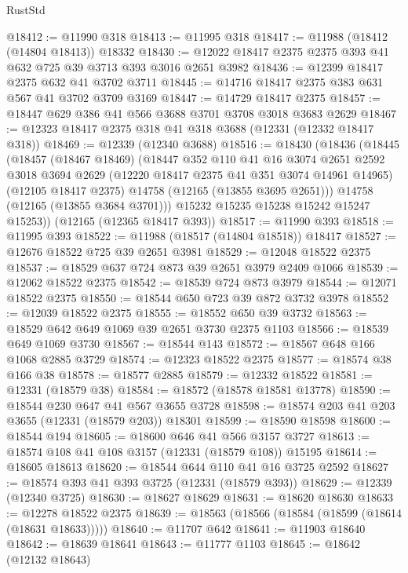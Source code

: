 \begin{lexlean}{RustStd}
\begin{coremodule}
@18412 := @11990 @318
@18413 := @11995 @318
@18417 := @11988 (@18412 (@14804 @18413)) @18332
@18430 := @12022 @18417 @2375 @2375 @393 @41 @632 @725 @39 @3713 @393 @3016 @2651 @3982
@18436 := @12399 @18417 @2375 @632 @41 @3702 @3711
@18445 := @14716 @18417 @2375 @383 @631 @567 @41 @3702 @3709 @3169
@18447 := @14729 @18417 @2375
@18457 := @18447 @629 @386 @41 @566 @3688 @3701 @3708 @3018 @3683 @2629
@18467 := @12323 @18417 @2375 @318 @41 @318 @3688 (@12331 (@12332 @18417 @318))
@18469 := @12339 (@12340 @3688)
@18516 := @18430
    (@18436
      (@18445
        (@18457
          (@18467 @18469)
          (@18447
            @352
            @110
            @41
            @16
            @3074
            @2651
            @2592
            @3018
            @3694
            @2629
            (@12220 @18417 @2375 @41 @351 @3074 @14961 @14965)
            (@12105 @18417 @2375)
            @14758
            (@12165 (@13855 @3695 @2651)))
          @14758
          (@12165 (@13855 @3684 @3701)))
        @15232
        @15235
        @15238
        @15242
        @15247
        @15253))
    (@12165 (@12365 @18417 @393))
@18517 := @11990 @393
@18518 := @11995 @393
@18522 := @11988 (@18517 (@14804 @18518)) @18417
@18527 := @12676 @18522 @725 @39 @2651 @3981
@18529 := @12048 @18522 @2375
@18537 := @18529 @637 @724 @873 @39 @2651 @3979 @2409 @1066
@18539 := @12062 @18522 @2375
@18542 := @18539 @724 @873 @3979
@18544 := @12071 @18522 @2375
@18550 := @18544 @650 @723 @39 @872 @3732 @3978
@18552 := @12039 @18522 @2375
@18555 := @18552 @650 @39 @3732
@18563 := @18529 @642 @649 @1069 @39 @2651 @3730 @2375 @1103
@18566 := @18539 @649 @1069 @3730
@18567 := @18544 @143
@18572 := @18567 @648 @166 @1068 @2885 @3729
@18574 := @12323 @18522 @2375
@18577 := @18574 @38 @166 @38
@18578 := @18577 @2885
@18579 := @12332 @18522
@18581 := @12331 (@18579 @38)
@18584 := @18572 (@18578 @18581 @13778)
@18590 := @18544 @230 @647 @41 @567 @3655 @3728
@18598 := @18574 @203 @41 @203 @3655 (@12331 (@18579 @203)) @18301
@18599 := @18590 @18598
@18600 := @18544 @194
@18605 := @18600 @646 @41 @566 @3157 @3727
@18613 := @18574 @108 @41 @108 @3157 (@12331 (@18579 @108)) @15195
@18614 := @18605 @18613
@18620 := @18544 @644 @110 @41 @16 @3725 @2592
@18627 := @18574 @393 @41 @393 @3725 (@12331 (@18579 @393))
@18629 := @12339 (@12340 @3725)
@18630 := @18627 @18629
@18631 := @18620 @18630
@18633 := @12278 @18522 @2375
@18639 := @18563 (@18566 (@18584 (@18599 (@18614 (@18631 @18633)))))
@18640 := @11707 @642
@18641 := @11903 @18640
@18642 := @18639 @18641
@18643 := @11777 @1103
@18645 := @18642 (@12132 @18643)

\end{coremodule}
\end{lexlean}
